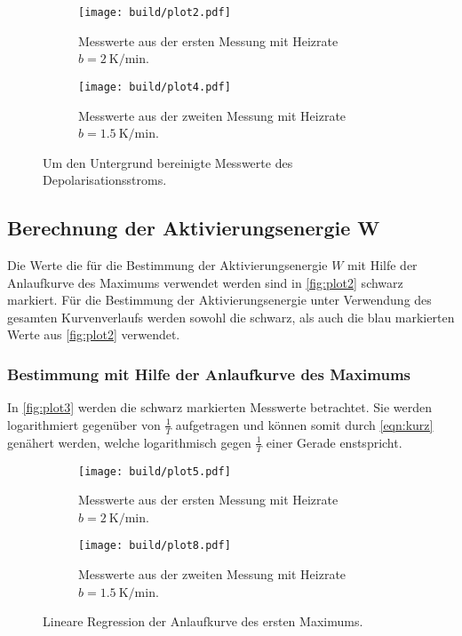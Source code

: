 \begin{figure}[H]
  \begin{subfigure}{\textwidth}
  \centering
  \texttt{[image: build/plot2.pdf]}
  \caption{Messwerte aus der ersten Messung mit Heizrate $b=\qty{2}{\kelvin\per\minute}$.}
  \label{fig:plot2a}
  \end{subfigure}
  \hfill
  \begin{subfigure}{\textwidth}
  \centering
  \texttt{[image: build/plot4.pdf]}
  \caption{Messwerte aus der zweiten Messung mit Heizrate $b=\qty{1.5}{\kelvin\per\minute}$.}
  \label{fig:plot2b}
  \end{subfigure}
  \caption{Um den Untergrund bereinigte Messwerte des Depolarisationsstroms.}
  \label{fig:plot2}
\end{figure}



\subsection{Berechnung der Aktivierungsenergie W}
\label{subsec:Aktivierungsenergie}

Die Werte die für die Bestimmung der Aktivierungsenergie $W$ mit Hilfe der Anlaufkurve des Maximums verwendet werden sind in \autoref{fig:plot2}
schwarz markiert.
Für die Bestimmung der Aktivierungsenergie unter Verwendung des gesamten Kurvenverlaufs werden sowohl die schwarz, als auch die blau
markierten Werte aus \autoref{fig:plot2} verwendet.

\subsubsection{Bestimmung mit Hilfe der Anlaufkurve des Maximums}

In \autoref{fig:plot3} werden die schwarz markierten Messwerte betrachtet. Sie werden logarithmiert gegenüber von $\frac{1}{T}$ aufgetragen
und können somit durch \autoref{eqn:kurz} genähert werden, welche logarithmisch gegen $\frac{1}{T}$ einer Gerade enstspricht.

\begin{figure}[H]
  \begin{subfigure}{\textwidth}
  \centering
  \texttt{[image: build/plot5.pdf]}
  \caption{Messwerte aus der ersten Messung mit Heizrate $b=\qty{2}{\kelvin\per\minute}$.}
  \label{fig:plot3a}
  \end{subfigure}
  \hfill
  \begin{subfigure}{\textwidth}
  \centering
  \texttt{[image: build/plot8.pdf]}
  \caption{Messwerte aus der zweiten Messung mit Heizrate $b=\qty{1.5}{\kelvin\per\minute}$.}
  \label{fig:plot3b}
  \end{subfigure}
  \caption{Lineare Regression der Anlaufkurve des ersten Maximums.}
  \label{fig:plot3}
\end{figure}

